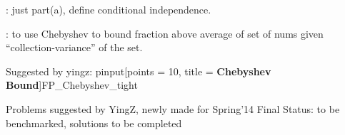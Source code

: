 \documentclass[quiz]{mcs}
\renewcommand{\examspace}[]{}
\begin{document}
\examspace
\begin{editingnotes}
: just part(a), define conditional independence.
\end{editingnotes}

\examspace
{}

\examspace
{}

\examspace
\begin{editingnotes}
: to use Chebyshev to bound fraction above average of
set of nums given ``collection-variance'' of the set.
\end{editingnotes}

\begin{editingnotes}
Suggested by yingz: pinput[points = 10, title = \textbf{Chebyshev Bound}]{FP\_Chebyshev\_tight}
\end{editingnotes}

\examspace
\begin{editingnotes}
Problems suggested by YingZ, newly made for Spring'14 Final
Status: to be benchmarked, solutions to be completed
\end{editingnotes}


\end{document}
